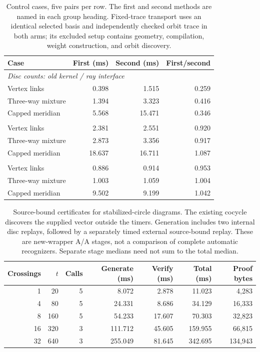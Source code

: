 \begin{table}[tbp]
\centering\small
\setlength{\tabcolsep}{4.5pt}
\caption{Control cases, five pairs per row. The first and second methods are named in each group heading. Fixed-trace transport uses an identical selected basis and independently checked orbit trace in both arms; its excluded setup contains geometry, compilation, weight construction, and orbit discovery.}
\label{tab:controls}
\begin{tabular}{lrrr}
\toprule
Case & First (ms) & Second (ms) & First/second \\
\midrule
\multicolumn{4}{l}{\emph{Disc counts: old kernel / ray interface}} \\
Vertex links & 0.398 & 1.515 & 0.259 \\
Three-way mixture & 1.394 & 3.323 & 0.416 \\
Capped meridian & 5.568 & 15.471 & 0.346 \\
\addlinespace[3pt]
\multicolumn{4}{l}{\emph{Coordinate censuses: old compact / packed}} \\
Vertex links & 2.381 & 2.551 & 0.920 \\
Three-way mixture & 2.873 & 3.356 & 0.917 \\
Capped meridian & 18.637 & 16.711 & 1.087 \\
\addlinespace[3pt]
\multicolumn{4}{l}{\emph{Fixed-trace transport: vector / packed}} \\
Vertex links & 0.886 & 0.914 & 0.953 \\
Three-way mixture & 1.003 & 1.059 & 1.004 \\
Capped meridian & 9.502 & 9.199 & 1.042 \\
\bottomrule
\end{tabular}
\end{table}

\begin{table}[tbp]
\centering\small
\setlength{\tabcolsep}{4.5pt}
\caption{Source-bound certificates for stabilized-circle diagrams. The existing cocycle discovers the supplied vector outside the timers. Generation includes two internal disc replays, followed by a separately timed external source-bound replay. These are new-wrapper A/A stages, not a comparison of complete automatic recognizers. Separate stage medians need not sum to the total median.}
\label{tab:diagramtimes}
\begin{tabular}{rrrrrrr}
\toprule
Crossings & $t$ & Calls & Generate (ms) & Verify (ms) & Total (ms) & Proof bytes \\
\midrule
1 & 20 & 5 & 8.072 & 2.878 & 11.023 & 4,283 \\
4 & 80 & 5 & 24.331 & 8.686 & 34.129 & 16,333 \\
8 & 160 & 5 & 54.233 & 17.607 & 70.303 & 32,823 \\
16 & 320 & 3 & 111.712 & 45.605 & 159.955 & 66,815 \\
32 & 640 & 3 & 255.049 & 81.645 & 342.695 & 134,943 \\
\bottomrule
\end{tabular}
\end{table}

